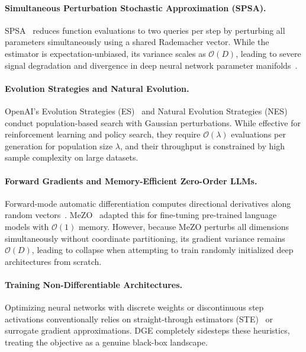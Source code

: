 \documentclass[11pt,a4paper]{article}
\begin{document}
\paragraph{Simultaneous Perturbation Stochastic Approximation (SPSA).}
SPSA~\citep{spall1992multivariate} reduces function evaluations to two queries per step by perturbing all parameters simultaneously using a shared Rademacher vector. While the estimator is expectation-unbiased, its variance scales as $\mathcal{O}(D)$, leading to severe signal degradation and divergence in deep neural network parameter manifolds~\citep{ghadimi2013optimal}.

\paragraph{Evolution Strategies and Natural Evolution.}
OpenAI's Evolution Strategies (ES)~\citep{salimans2013evolution} and Natural Evolution Strategies (NES)~\citep{wierstra2014natural} conduct population-based search with Gaussian perturbations. While effective for reinforcement learning and policy search, they require $\mathcal{O}(\lambda)$ evaluations per generation for population size $\lambda$, and their throughput is constrained by high sample complexity on large datasets.

\paragraph{Forward Gradients and Memory-Efficient Zero-Order LLMs.}
Forward-mode automatic differentiation computes directional derivatives along random vectors~\citep{baydin2022survey}. MeZO~\citep{malladi2023mezo} adapted this for fine-tuning pre-trained language models with $\mathcal{O}(1)$ memory. However, because MeZO perturbs all dimensions simultaneously without coordinate partitioning, its gradient variance remains $\mathcal{O}(D)$, leading to collapse when attempting to train randomly initialized deep architectures from scratch.

\paragraph{Training Non-Differentiable Architectures.}
Optimizing neural networks with discrete weights or discontinuous step activations conventionally relies on straight-through estimators (STE)~\citep{bengio2013estimating} or surrogate gradient approximations. DGE completely sidesteps these heuristics, treating the objective as a genuine black-box landscape.
\end{document}
